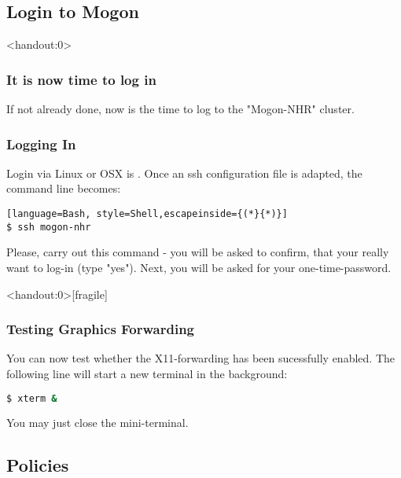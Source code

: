\subsection{Login to Mogon}

\begin{frame}<handout:0>
	\frametitle{It is now time to log in}
	If not already done, now is the time to log to the "Mogon-NHR" cluster.\\
\end{frame}

\begin{frame}[fragile]
	\frametitle{Logging In}
	Login via Linux or OSX is . Once an ssh configuration file is adapted, the command line becomes:
	\begin{lstlisting}[language=Bash, style=Shell,escapeinside={(*}{*)}]
$ ssh mogon-nhr
	\end{lstlisting}
    \begin{task}
    	Please, carry out this command - you will be asked to confirm, that your really want to log-in (type "yes"). Next, you will be asked for your one-time-password.
    \end{task}
\end{frame}


\begin{frame}<handout:0>[fragile]
	\frametitle{Testing Graphics Forwarding}
	You can now test whether the X11-forwarding has been sucessfully enabled. The following line will start a new terminal in the background:
	\begin{lstlisting}[language=Bash, style=Shell]
$ xterm &
	\end{lstlisting}
    You may just close the mini-terminal.
\end{frame}

\subsection*{Policies}

